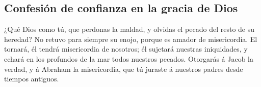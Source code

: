 \hypertarget{confesiuxf3n-de-confianza-en-la-gracia-de-dios}{%
\subsection{Confesión de confianza en la gracia de
Dios}\label{confesiuxf3n-de-confianza-en-la-gracia-de-dios}}

 ¿Qué Dios como tú, que perdonas la maldad, y olvidas el
pecado del resto de su heredad? No retuvo para siempre su enojo, porque
es amador de misericordia.  El tornará, él tendrá
misericordia de nosotros; él sujetará nuestras iniquidades, y echará en
los profundos de la mar todos nuestros pecados. 
Otorgarás á Jacob la verdad, y á Abraham la misericordia, que tú juraste
á nuestros padres desde tiempos antiguos.
